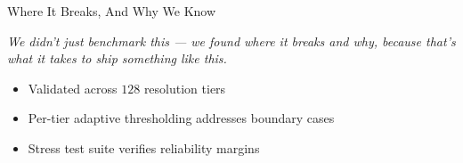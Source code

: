 \documentclass[aspectratio=169, 11pt]{beamer}
\newcommand{\emphred}[1]{\textcolor{secondary}{#1}}
\begin{document}
\begin{frame}{\emphred{Where It Breaks, And Why We Know}}
    \begin{center}
        \small\itshape We didn't just benchmark this --- we found where it breaks and why, because that's what it takes to ship something like this.
    \end{center}

    \vspace{0.4cm}

    \vspace{0.8cm}
    \begin{itemize}
        \item {} Validated across $128$ resolution tiers
        \item {} Per-tier adaptive thresholding addresses boundary cases
        \item {} Stress test suite verifies reliability margins
    \end{itemize}
\end{frame}
\end{document}
